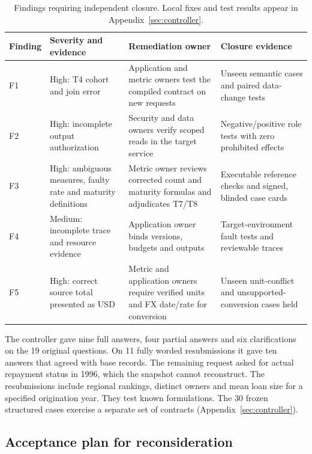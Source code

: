 \documentclass[11pt,a4paper,onecolumn,oneside]{rho-class/rho}
\begin{document}
\begin{table}[H]
\centering\small\renewcommand{\arraystretch}{1.22}
\begin{tabularx}{\linewidth}{@{}p{.08\linewidth}p{.23\linewidth}XX@{}}
\toprule
\textbf{Finding} & \textbf{Severity and evidence} & \textbf{Remediation owner} & \textbf{Closure evidence}\\\midrule
F1 & High: T4 cohort and join error & Application and metric owners test the compiled contract on new requests & Unseen semantic cases and paired data-change tests\\
F2 & High: incomplete output authorization & Security and data owners verify scoped reads in the target service & Negative/positive role tests with zero prohibited effects\\
F3 & High: ambiguous measures, faulty rate and maturity definitions & Metric owner reviews corrected count and maturity formulas and adjudicates T7/T8 & Executable reference checks and signed, blinded case cards\\
F4 & Medium: incomplete trace and resource evidence & Application owner binds versions, budgets and outputs & Target-environment fault tests and reviewable traces\\
F5 & High: correct source total presented as USD & Metric and application owners require verified units and FX date/rate for conversion & Unseen unit-conflict and unsupported-conversion cases held\\
\bottomrule
\end{tabularx}
\caption{Findings requiring independent closure. Local fixes and test results appear in Appendix~\ref{sec:controller}.}
\end{table}

The controller gave nine full answers, four partial answers and six clarifications on the 19 original questions. On 11 fully worded resubmissions it gave ten answers that agreed with base records. The remaining request asked for actual repayment status in 1996, which the snapshot cannot reconstruct. The resubmissions include regional rankings, distinct owners and mean loan size for a specified origination year. They test known formulations. The 30 frozen structured cases exercise a separate set of contracts (Appendix~\ref{sec:controller}).


\clearpage
\subsection{Acceptance plan for reconsideration}
\end{document}
